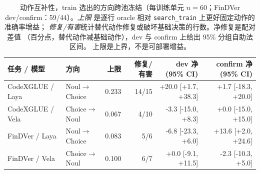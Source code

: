 \begin{table}[t]
\centering
\footnotesize
\caption{动作互补性，train 选出的方向跨池冻结（每训练单元 $n=60$；FinDVer dev/confirm：59/44）。\emph{上限}
是逐行 oracle 相对 \texttt{search\_train} 上更好固定动作的准确率增益；
\emph{修复/有害}统计替代动作修复或破坏基础决策的行数。净修复是配对差值
（百分点，替代动作减基础动作），dev 与 confirm 上给出 95\% 分组自助法区间。
上限是上界，不是可部署增益。}
\label{tab:complementarity}
\begin{tabular}{@{}llrrrr@{}}
\toprule
任务 / 模型 & 方向 & 上限 & 修复/有害 & dev 净 (95\% CI) & confirm 净 (95\% CI) \\
\midrule
CodeXGLUE / Laya & Noul$\to$Choice & 0.233 & 14/15 & +20.0 [+1.7, +38.3] & +1.7 [-18.3, +20.0] \\
CodeXGLUE / Vela & Choice$\to$Noul & 0.067 & 4/10 & -3.3 [-15.0, +8.3] & +0.0 [-15.0, +15.0] \\
FinDVer / Laya & Noul$\to$Choice & 0.083 & 5/6 & -6.8 [-23.3, +6.0] & +13.6 [+2.0, +24.6] \\
FinDVer / Vela & Choice$\to$Noul & 0.100 & 6/7 & +0.0 [-9.1, +11.5] & -2.3 [-10.3, +5.0] \\
\bottomrule
\end{tabular}
\end{table}
